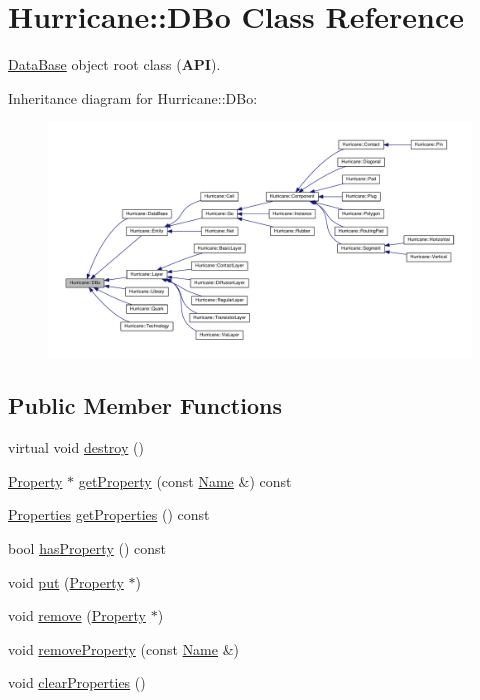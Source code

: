 \hypertarget{classHurricane_1_1DBo}{\section{Hurricane\-:\-:D\-Bo Class Reference}
\label{classHurricane_1_1DBo}
}


\hyperlink{classHurricane_1_1DataBase}{Data\-Base} object root class ({\bfseries A\-P\-I}).  




Inheritance diagram for Hurricane\-:\-:D\-Bo\-:\nopagebreak
\begin{figure}[H]
\begin{center}
\leavevmode
\includegraphics[width=350pt]{classHurricane_1_1DBo__inherit__graph}
\end{center}
\end{figure}
\subsection*{Public Member Functions}
\begin{DoxyCompactItemize}
\item 
virtual void \hyperlink{classHurricane_1_1DBo_a67febf5bf9c8b322674648688639728b}{destroy} ()
\item 
\hyperlink{classHurricane_1_1Property}{Property} $\ast$ \hyperlink{classHurricane_1_1DBo_a0026da8391fae433ce069c2ba6455fe8}{get\-Property} (const \hyperlink{classHurricane_1_1Name}{Name} \&) const 
\item 
\hyperlink{namespaceHurricane_afd7bca6dad4be54b7c03b0463e6c0004}{Properties} \hyperlink{classHurricane_1_1DBo_acafb68a90cdddb0921e742f3bab3da6b}{get\-Properties} () const 
\item 
bool \hyperlink{classHurricane_1_1DBo_af03127d0697ce89e3640b5c3429d7752}{has\-Property} () const 
\item 
void \hyperlink{classHurricane_1_1DBo_a8979674f11507cb4c7c5251b41ed72d5}{put} (\hyperlink{classHurricane_1_1Property}{Property} $\ast$)
\item 
void \hyperlink{classHurricane_1_1DBo_a7833a1f0b8c704930bdc00861e63cf5e}{remove} (\hyperlink{classHurricane_1_1Property}{Property} $\ast$)
\item 
void \hyperlink{classHurricane_1_1DBo_ac35fbb8303b1a78db5ca0fc831fb6a0c}{remove\-Property} (const \hyperlink{classHurricane_1_1Name}{Name} \&)
\item 
void \hyperlink{classHurricane_1_1DBo_a3e02f3d665cb0b2120df2fdfe9c3df4f}{clear\-Properties} ()
\end{DoxyCompactItemize}


